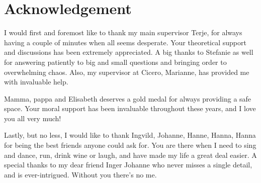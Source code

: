 \chapter*{Acknowledgement}
I would first and foremost like to thank my main supervisor Terje, for always having a couple of minutes when all seems desperate. Your theoretical support and discussions has been extremely appreciated. A big thanks to Stefanie as well for answering patiently to big and small questions and bringing order to overwhelming chaos. Also, my supervisor at Cicero, Marianne, has provided me with invaluable help.  

\medskip

Mamma, pappa and Elisabeth deserves a gold medal for always providing a safe space. Your moral support has been invaluable throughout these years, and I love you all very much!

\medskip

Lastly, but no less, I would like to thank Ingvild, Johanne, Hanne, Hanna, Hanna for being the best friends anyone could ask for. You are there when I need to sing and dance, run, drink wine or laugh, and have made my life a great deal easier. A special thanks to my dear friend Inger Johanne who never misses a single detail, and is ever-intrigued. Without you there's no me.

\cleardoublepage
